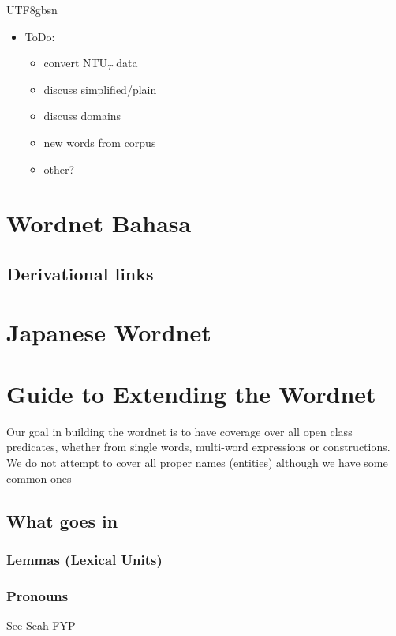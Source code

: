 \documentclass[12pt]{book} %
\begin{document}
\begin{CJK}{UTF8}{gbsn}
\begin{itemize}
\item ToDo:
  \begin{itemize}
  \item convert NTU$_T$ data
  \item discuss simplified/plain
  \item discuss domains
  \item new words from corpus
  \item other?
  \end{itemize}

\end{itemize}

\section{Wordnet Bahasa}

\subsection{Derivational links}

\section{Japanese Wordnet}


\section{Guide to Extending the Wordnet}

Our goal in building the wordnet is to have coverage over all open
class predicates, whether from single words, multi-word expressions or
constructions.  We do not attempt to cover all proper names (entities)
although we have some common ones

\subsection{What goes in}

\subsubsection{Lemmas (Lexical Units)}

\subsubsection{Pronouns}

See Seah FYP



\end{CJK}
\end{document}

